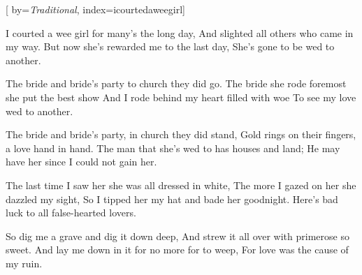 
[%
    by={\textit{Traditional}},
    index={icourtedaweegirl}]


    \label{icourtedaweegirl}

    \beginverse
        I courted a wee girl for many's the long day,
        And slighted all others who came in my way.
        But now she's rewarded me to the last day,
        She's gone to be wed to another.
    \endverse

    \beginverse
        The bride and bride's party to church they did go.
        The bride she rode foremost she put the best show
        And I rode behind my heart filled with woe
        To see my love wed to another.
    \endverse

    \beginverse
        The bride and bride's party, in church they did stand,
        Gold rings on their fingers, a love hand in hand.
        The man that she's wed to has houses and land;
        He may have her since I could not gain her.
    \endverse

    \beginverse
        The last time I saw her she was all dressed in white,
        The more I gazed on her she dazzled my sight,
        So I tipped her my hat and bade her goodnight.
        Here's bad luck to all false-hearted lovers.
    \endverse

    \beginverse
        So dig me a grave and dig it down deep,
        And strew it all over with primerose so sweet.
        And lay me down in it for no more for to weep,
        For love was the cause of my ruin.
    \endverse
\endsong
